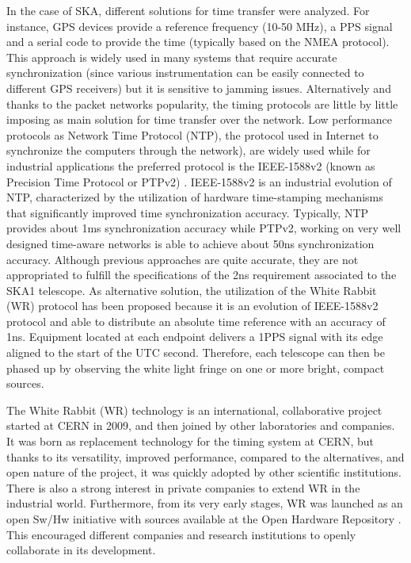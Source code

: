 In the case of SKA, different solutions for time transfer were analyzed. For instance, GPS devices provide a reference frequency (10-50 MHz), a PPS signal and a serial code to provide the time (typically based on the NMEA protocol). This approach is widely used in many systems that require accurate synchronization (since various instrumentation can be easily connected to different GPS receivers) but it is sensitive to jamming issues. Alternatively and thanks to the packet networks popularity, the timing protocols are little by little imposing as main solution for time transfer over the network. Low performance protocols as Network Time Protocol (NTP), the protocol used in Internet to synchronize the computers through the network), \cite{ntf:ntp_std} are widely used while for industrial applications the preferred protocol is the IEEE-1588v2 (known as Precision Time Protocol or PTPv2) \cite{ieee:ieee1588_std} \cite{itu:TG8275_1_Y_1369_1}. IEEE-1588v2 is an industrial evolution of NTP, characterized by the utilization of hardware time-stamping mechanisms that significantly improved time synchronization accuracy. Typically, NTP provides about 1ms synchronization accuracy while PTPv2, working on very well designed time-aware networks is able to achieve about 50ns synchronization accuracy. 
Although previous approaches are quite accurate, they are not appropriated to fulfill the specifications of the 2ns requirement associated to the SKA1 telescope. As alternative solution, the utilization of the White Rabbit (WR) protocol has been proposed because it is an evolution of IEEE-1588v2 protocol and able to distribute an absolute time reference with an accuracy of 1ns. Equipment located at each endpoint delivers a 1PPS signal with its edge aligned to the start of the UTC second. Therefore, each telescope can then be phased up by observing the white light fringe on one or more bright, compact sources.

The White Rabbit (WR) technology is an international, collaborative project started at CERN in 2009, and then joined by other laboratories and companies. It was born as replacement technology for the timing system at CERN, but thanks to its versatility, improved performance, compared to the alternatives, and open nature of the project, it was quickly adopted by other scientific institutions. There is also a strong interest in private companies to extend WR in the   industrial world. Furthermore, from its very early stages, WR was launched as an open Sw/Hw initiative with sources available at the Open Hardware Repository \cite{ohwr:repo}. This encouraged different companies and research institutions to openly collaborate in its development.

